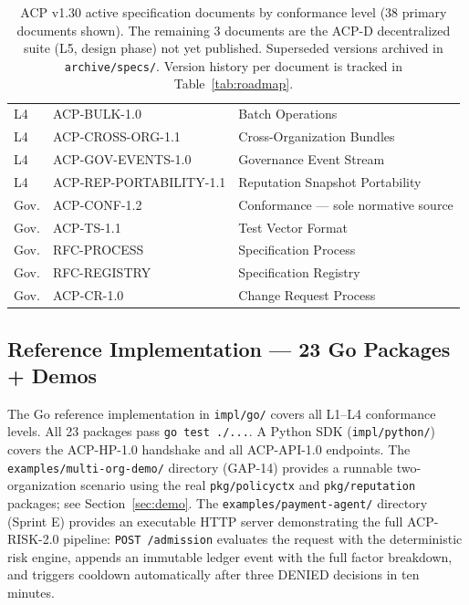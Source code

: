 \documentclass[11pt]{article}
\theoremstyle{definition}
\begin{document}
\begin{table}[h!]
\begin{tabular}{@{}lll@{}}
L4 & ACP-BULK-1.0 & Batch Operations \\
L4 & ACP-CROSS-ORG-1.1 & Cross-Organization Bundles \\
L4 & ACP-GOV-EVENTS-1.0 & Governance Event Stream \\
L4 & ACP-REP-PORTABILITY-1.1 & Reputation Snapshot Portability \\
\midrule
Gov. & ACP-CONF-1.2 & Conformance --- sole normative source \\
Gov. & ACP-TS-1.1 & Test Vector Format \\
Gov. & RFC-PROCESS & Specification Process \\
Gov. & RFC-REGISTRY & Specification Registry \\
Gov. & ACP-CR-1.0 & Change Request Process \\
\bottomrule
\end{tabular}
\caption{ACP v1.30 active specification documents by conformance level (38 primary documents shown).
The remaining 3 documents are the ACP-D decentralized suite (L5, design phase) not yet published.
Superseded versions archived in \texttt{archive/specs/}.
Version history per document is tracked in Table~\ref{tab:roadmap}.}
\end{table}

\subsection{Reference Implementation --- 23 Go Packages + Demos}
\label{sec:implementation}

The Go reference implementation in \texttt{impl/go/} covers all L1--L4 conformance levels.
All 23 packages pass \texttt{go test ./...}.
A Python SDK (\texttt{impl/python/}) covers the ACP-HP-1.0 handshake and all ACP-API-1.0 endpoints.
The \texttt{examples/multi-org-demo/} directory (GAP-14) provides a runnable two-organization scenario using the real \texttt{pkg/policyctx} and \texttt{pkg/reputation} packages; see Section~\ref{sec:demo}.
The \texttt{examples/payment-agent/} directory (Sprint E) provides an executable HTTP server demonstrating the full ACP-RISK-2.0 pipeline: \texttt{POST /admission} evaluates the request with the deterministic risk engine, appends an immutable ledger event with the full factor breakdown, and triggers cooldown automatically after three DENIED decisions in ten minutes.
\end{document}
